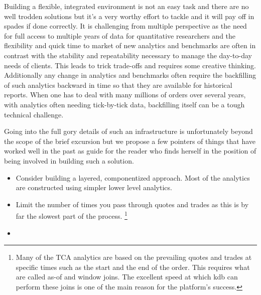 Building a flexible, integrated environment is not an easy task and there are no well trodden solutions but it's a very worthy effort to tackle and it will pay off in spades if done correctly. It is challenging from multiple perspective as the need for full access to multiple years of data  for quantitative researchers and the flexibility and quick time to market of new analytics and benchmarks are often in contrast with the stability and repeatability necessary to manage the day-to-day needs of clients. This leads to trick trade-offs and requires some creative thinking. \\ Additionally any change in analytics and benchmarks often require the backfilling of such analytics backward in time so that they are available for historical reports. When one has to deal with many millions of orders over several years, with analytics often needing tick-by-tick data, backfilling itself can be a tough technical challenge.

Going into the full gory details of such an infrastructure is unfortunately beyond the scope of the brief excursion but we propose a few pointers of things that have worked well in the past as  guide for the reader who finds herself in the position of being involved in building such a solution.
\begin{itemize}
\item Consider building a layered, componentized approach. Most of the analytics are constructed using simpler lower level analytics. 
\item Limit the number of times you pass through quotes and trades as this is by far the slowest part of the process. \footnote{Many of the TCA analytics are based on the prevailing quotes and trades at specific times such as the start and the end of the order. This requires what are called  as-of and window joins. The excellent speed at which kdb can perform these joins is one of the main reason for the platform's success. }
\item
\end{itemize}
